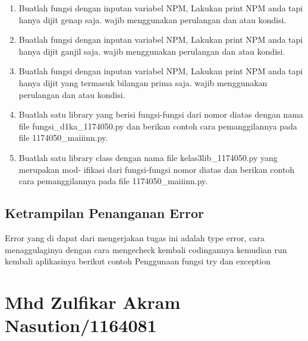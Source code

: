 \begin{enumerate}
    \item Buatlah fungsi dengan inputan variabel NPM, Lakukan print NPM anda tapi
    hanya dijit genap saja. wajib menggunakan perulangan dan atau kondisi.
    

    \item Buatlah fungsi dengan inputan variabel NPM, Lakukan print NPM anda tapi
    hanya dijit ganjil saja. wajib menggunakan perulangan dan atau kondisi.
    

    \item Buatlah fungsi dengan inputan variabel NPM, Lakukan print NPM anda tapi
    hanya dijit yang termasuk bilangan prima saja. wajib menggunakan perulangan
    dan atau kondisi.
    

    \item Buatlah satu library yang berisi fungsi-fungsi dari nomor diatas dengan nama
    file fungsi\_d1ka\_1174050.py dan berikan contoh cara pemanggilannya pada file 1174050\_maiiinn.py.
    

    \item Buatlah satu library class dengan nama file kelas3lib\_1174050.py yang merupakan mod-
    ifikasi dari fungsi-fungsi nomor diatas dan berikan contoh cara pemanggilannya      
    pada file 1174050\_maiiinn.py.
    
    
\end{enumerate}
\subsection{Ketrampilan Penanganan Error}
Error yang di dapat dari mengerjakan tugas ini adalah type error, cara menaggulaginya dengan cara mengecheck kembali codingannya
kemudian run kembali aplikasinya
berikut contoh Penggunaan fungsi try dan exception



\section{Mhd Zulfikar Akram Nasution/1164081}
